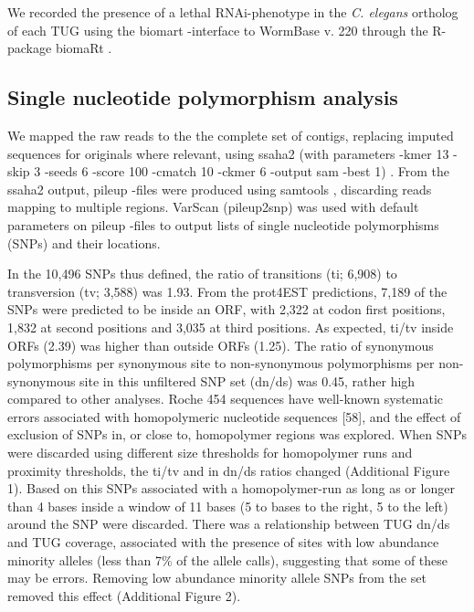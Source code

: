 \documentclass[10pt]{bmc_article}
\newenvironment{bmcformat}{\begin{raggedright}\baselineskip20pt\sloppy\setboolean{publ}{false}}{\end{raggedright}\baselineskip20pt\sloppy}
\begin{document}
\begin{bmcformat}
We recorded the presence of a lethal RNAi-phenotype in the
\textit{C. elegans} ortholog of each TUG using the biomart -interface
\cite{pmid22083790} to WormBase v. 220 through the R-package biomaRt
\cite{pmid19617889}.

\subsection*{Single nucleotide polymorphism analysis}

We mapped the raw reads to the the complete set of contigs, replacing
imputed sequences for originals where relevant, using ssaha2 (with
parameters -kmer 13 -skip 3 -seeds 6 -score 100 -cmatch 10 -ckmer 6
-output sam -best 1) \cite{pmid11591649}. From the ssaha2 output,
pileup -files were produced using samtools
\cite{journals/bioinformatics/LiHWFRHMAD09}, discarding reads mapping
to multiple regions. VarScan \cite{pmid19542151} (pileup2snp) was used
with default parameters on pileup -files to output lists of single
nucleotide polymorphisms (SNPs) and their locations.


In the 10,496 SNPs thus defined, the ratio of transitions (ti; 6,908)
to transversion (tv; 3,588) was 1.93. From the prot4EST predictions,
7,189 of the SNPs were predicted to be inside an ORF, with 2,322 at
codon first positions, 1,832 at second positions and 3,035 at third
positions. As expected, ti/tv inside ORFs (2.39) was higher than
outside ORFs (1.25). The ratio of synonymous polymorphisms per
synonymous site to non-synonymous polymorphisms per non-synonymous
site in this unfiltered SNP set (dn/ds) was 0.45, rather high compared
to other analyses. Roche 454 sequences have well-known systematic
errors associated with homopolymeric nucleotide sequences [58], and
the effect of exclusion of SNPs in, or close to, homopolymer regions
was explored. When SNPs were discarded using different size thresholds
for homopolymer runs and proximity thresholds, the ti/tv and in dn/ds
ratios changed (Additional Figure 1). Based on this SNPs associated with a
homopolymer-run as long as or longer than 4 bases inside a window of
11 bases (5 to bases to the right, 5 to the left) around the SNP were
discarded. There was a relationship between TUG dn/ds and TUG
coverage, associated with the presence of sites with low abundance
minority alleles (less than 7\% of the allele calls), suggesting that
some of these may be errors. Removing low abundance minority allele
SNPs from the set removed this effect (Additional Figure 2).


\end{bmcformat}
\end{document}
